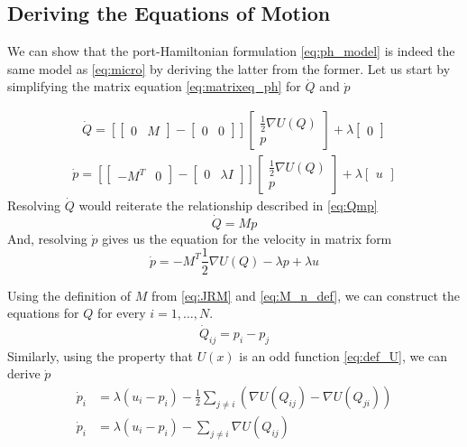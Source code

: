 \hrulefill

\subsection{Deriving the Equations of Motion}
We can show that the port-Hamiltonian formulation \autoref{eq:ph_model} is indeed the same model as \autoref{eq:micro} by deriving the latter from the former. 
Let us start by simplifying the matrix equation \autoref{eq:matrixeq_ph} for $\dot Q$ and $\dot p$

\begin{gather*}
    \dot Q = 
    \left[
    \begin{bmatrix}
        0 & M
    \end{bmatrix}
    - \begin{bmatrix}
        0 & 0
    \end{bmatrix}
    \right]
    \begin{bmatrix}
        \frac{1}{2}\nabla U(Q) \\
        p
    \end{bmatrix}
    +\lambda\begin{bmatrix}
        0
    \end{bmatrix}
\end{gather*}
\begin{gather*}
    \dot p= 
    \left[
    \begin{bmatrix}
        -M^T & 0
    \end{bmatrix}
    - \begin{bmatrix}
        0 & \lambda I
    \end{bmatrix}
    \right]
    \begin{bmatrix}
        \frac{1}{2}\nabla U(Q) \\
        p
    \end{bmatrix}
    +\lambda\begin{bmatrix}
        u
    \end{bmatrix}
\end{gather*}
Resolving $\dot Q$ would reiterate the relationship described in \autoref{eq:Qmp}
\begin{equation*}
    \dot Q = Mp
\end{equation*}
And, resolving $\dot p$ gives us the equation for the velocity in matrix form
\begin{equation*}
    \dot p = -M^T\frac{1}{2}\nabla U(Q) - \lambda p + \lambda u
\end{equation*}

Using the definition of $M$ from \autoref{eq:JRM} and \autoref{eq:M_n_def}, we can construct the equations for $Q$ for every $i = 1,\dots,N$.
\begin{align*}
    \dot Q_{ij} = p_i - p_j
\end{align*}
Similarly, using the property that $U(x)$ is an odd function \autoref{eq:def_U}, we can derive $\dot p$
\begin{align*}
    \dot p_i &= \lambda(u_i - p_i) - \frac{1}{2}\sum_{j \neq i}(\nabla U(Q_{ij}) - \nabla U(Q_{ji})) \\ 
    \dot p_i &= \lambda(u_i - p_i) - \sum_{j \neq i}\nabla U(Q_{ij}) 
\end{align*}

